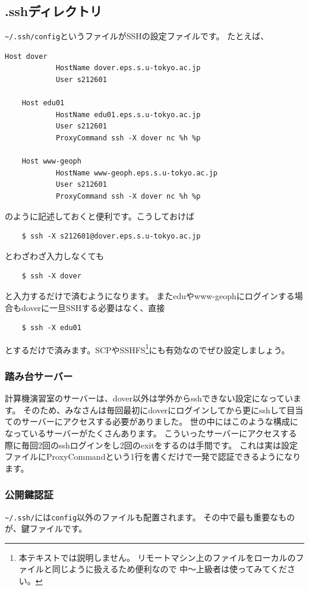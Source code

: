 \documentclass[a4j]{ltjsreport}
\begin{document}
    \subsection{.sshディレクトリ}
    \verb|~/.ssh/config|というファイルがSSHの設定ファイルです。
    たとえば、
    \begin{Verbatim}[baselinestretch=0.5]
    Host dover
            HostName dover.eps.s.u-tokyo.ac.jp
            User s212601

    Host edu01
            HostName edu01.eps.s.u-tokyo.ac.jp
            User s212601
            ProxyCommand ssh -X dover nc %h %p

    Host www-geoph
            HostName www-geoph.eps.s.u-tokyo.ac.jp
            User s212601
            ProxyCommand ssh -X dover nc %h %p
    \end{Verbatim}
    のように記述しておくと便利です。こうしておけば
    \begin{verbatim}
    $ ssh -X s212601@dover.eps.s.u-tokyo.ac.jp
    \end{verbatim}
    とわざわざ入力しなくても
    \begin{verbatim}
    $ ssh -X dover
    \end{verbatim}
    と入力するだけで済むようになります。
    またeduやwww-geophにログインする場合もdoverに一旦SSHする必要はなく、直接
    \begin{verbatim}
    $ ssh -X edu01
    \end{verbatim}
    とするだけで済みます。SCPやSSHFS\footnote{本テキストでは説明しません。
    リモートマシン上のファイルをローカルのファイルと同じように扱えるため便利なので
    中〜上級者は使ってみてください。}にも有効なのでぜひ設定しましょう。

    \subsubsection{踏み台サーバー}
    計算機演習室のサーバーは、dover以外は学外からsshできない設定になっています。
    そのため、みなさんは毎回最初にdoverにログインしてから更にsshして目当てのサーバーにアクセスする必要がありました。
    世の中にはこのような構成になっているサーバーがたくさんあります。
    こういったサーバーにアクセスする際に毎回2回のsshログインをし2回のexitをするのは手間です。
    これは実は設定ファイルにProxyCommandという1行を書くだけで一発で認証できるようになります。

    \subsubsection{公開鍵認証}
    \verb|~/.ssh/|には\verb|config|以外のファイルも配置されます。
    その中で最も重要なものが、鍵ファイルです。
\end{document}

